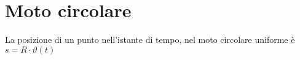 \section{Moto circolare}

La posizione di un punto nell'istante di tempo, nel moto circolare uniforme è $s=R\cdot \vartheta (t)$
